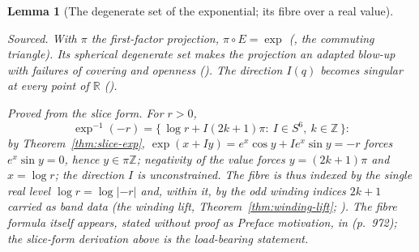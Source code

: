 \documentclass[11pt]{article}
\newcommand{\RR}{\mathbb{R}}
\newcommand{\ZZ}{\mathbb{Z}}
\providecommand{\lean}[1]{}
\providecommand{\uses}[1]{}
\theoremstyle{plain}
\newtheorem{lemma}[theorem]{Lemma}
\theoremstyle{definition}
\theoremstyle{remark}
\begin{document}
\begin{lemma}[The degenerate set of the exponential; its fibre over a real value]\label{lem:exp-degenerate}
\lean{Octonion.exp_fibre_neg_real, Octonion.exp_eq_neg_ofReal_iff,
Octonion.logManifold_fibre_neg_real, Octonion.degenerate_level_readout}
\uses{thm:slice-exp, thm:log-manifold}
\emph{Sourced.} With $\pi$ the first-factor projection, $\pi\circ E=\exp$
\textup{(\cite[Rem.~5.2(a)]{VS}, the commuting triangle)}. Its spherical
\emph{degenerate set} makes the projection an adapted blow-up with failures of covering and
openness \textup{(\cite[Rem.~5.2(b)]{VS})}. The direction $I(q)$ becomes singular at every
point of $\RR$ \textup{(\cite[Rem.~2.1]{GPVwind})}.

\emph{Proved from the slice form.} For $r>0$,
\[
\exp^{-1}(-r)=\bigl\{\,\log r+I(2k{+}1)\pi:\ I\in S^6,\ k\in\ZZ\,\bigr\}:
\]
by Theorem~\ref{thm:slice-exp}, $\exp(x+Iy)=e^{x}\cos y+Ie^{x}\sin y=-r$ forces
$e^{x}\sin y=0$, hence $y\in\pi\ZZ$; negativity of the value forces $y=(2k{+}1)\pi$ and
$x=\log r$; the direction $I$ is unconstrained. The fibre is thus indexed by the single real
\emph{level} $\log r=\log|{-}r|$ and, within it, by the odd winding indices $2k{+}1$ carried as
band data (the winding lift, Theorem~\ref{thm:winding-lift}; \cite[Cor.~5.21]{GPVwind}).
The fibre formula itself appears, stated without proof as Preface motivation, in \cite{VS}
(p.~972); the slice-form derivation above is the load-bearing statement.
\end{lemma}
\end{document}
